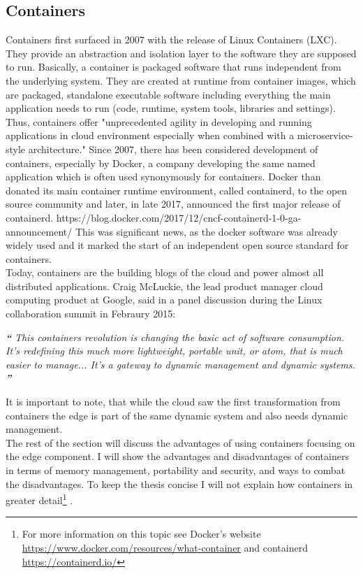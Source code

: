 \subsection{Containers} \label{containers}
Containers first surfaced in 2007 with the release of Linux Containers (LXC). They provide an abstraction and isolation layer to the software they are supposed to run. Basically, a container is packaged software that runs independent from the underlying system. They are created at runtime from container images, which are packaged, standalone executable software including everything the main application needs to run (code, runtime, system tools, libraries and settings)\cite{containerDefinition:online}. Thus, containers offer
"unprecedented agility in developing and running applications in cloud environment especially when combined with a microservice-style architecture."\cite{microserviceContainers} Since 2007, there has been considered development of containers, especially by Docker, a company developing the same named application which is often used synonymously for containers. Docker than donated its main container runtime environment, called containerd, to the open source community and later, in late 2017, announced the first major release of containerd. https://blog.docker.com/2017/12/cncf-containerd-1-0-ga-announcement/ This was significant news, as the docker software was already widely used and it marked the start of an independent open source standard for containers. \\
Today, containers are the building blogs of the cloud and power almost all distributed applications. Craig McLuckie, the lead product manager cloud computing product at Google, said in a panel discussion during the Linux collaboration summit in Febraury 2015:
\begin{displayquote}
\textit{\textbf{\large{``}}}
\textit{This containers revolution is changing the basic act of software consumption. It’s redefining this much more lightweight, portable unit, or atom, that is much easier to manage... It’s a gateway to dynamic management and dynamic systems.}
\textit{\textbf{\large{''}}}
\end{displayquote}
It is important to note, that while the cloud saw the first transformation from containers the edge is part of the same dynamic system and also needs dynamic management.\\ 
The rest of the section will discuss the advantages of using containers focusing on the edge component. I will show the advantages and disadvantages of containers in terms of memory management, portability and security, and ways to combat the disadvantages. To keep the thesis concise I will not explain how containers in greater detail\footnote{For more information on this topic see Docker's website  \url{https://www.docker.com/resources/what-container} and containerd \url{https://containerd.io/}} .


